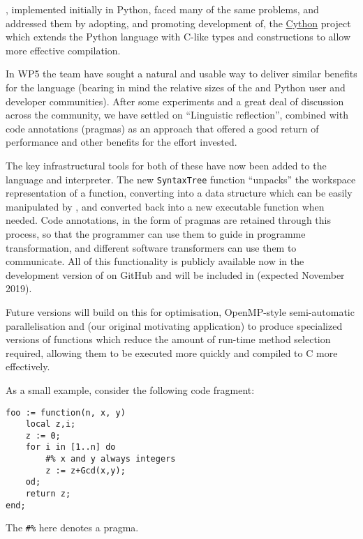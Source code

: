 \Sage, implemented initially in Python, faced many of the same
problems, and addressed them by adopting, and promoting
development of, the \href{http://cython.org}{Cython} project which
extends the Python language with C-like types and constructions to
allow more effective compilation.

In WP5 the \GAP team have sought a natural and usable way to deliver
similar benefits for the \GAP language (bearing in mind the relative
sizes of the \GAP and Python user and developer communities). After
some experiments and a great deal of discussion across the community,
we have settled on ``Linguistic reflection'', combined with code
annotations (pragmas) as an approach that offered a good return of
performance and other benefits for the effort invested.

The key infrastructural tools for both of these have now been added to
the \GAP language and interpreter. The new \verb|SyntaxTree| function
``unpacks'' the workspace representation of a \GAP function,
converting into a data structure which can be easily manipulated by
\GAP, and converted back into a new executable \GAP function when
needed. Code annotations, in the form of pragmas are retained through
this process, so that the programmer can use them to guide in
programme transformation, and different software transformers can use
them to communicate. All of this functionality is publicly available
now in the development version of \GAP on GitHub and will be included
in  (expected November 2019).

Future versions will build on this for optimisation, OpenMP-style
semi-automatic parallelisation and (our original motivating
application) to produce specialized versions of functions which reduce
the amount of run-time method selection required, allowing them to be
executed more quickly and compiled to C more effectively.

As a small example, consider the following code fragment:
\begin{Small}
\begin{verbatim}
foo := function(n, x, y)
    local z,i;
    z := 0;
    for i in [1..n] do
        #% x and y always integers
        z := z+Gcd(x,y);
    od;
    return z;
end;
\end{verbatim}
\end{Small}
The \verb|#%| here denotes a pragma.

